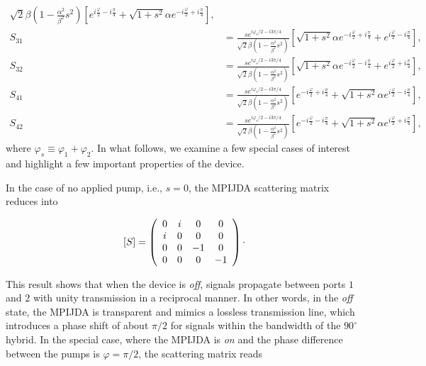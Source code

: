 \documentclass[aip,onecolumn,10pt]{revtex4}%
\begin{document}
\begin{align}
{}{\sqrt{2}\beta\left(  1-\frac{\alpha^{2}}{\beta^{2}}s^{2}\right)  }\left[
e^{i\frac{\varphi}{2}-i\frac{\pi}{4}}+\sqrt{1+s^{2}}\alpha e^{-i\frac
	{\varphi}{2}+i\frac{\pi}{4}}\right]  ,\label{S24}\\
S_{31} &  =\frac{se^{i  \varphi_{s}  /2-i3\pi/4}%
}{\sqrt{2}\beta\left(  1-\frac{\alpha^{2}}{\beta^{2}}s^{2}\right)  }\left[
\sqrt{1+s^{2}}\alpha e^{-i\frac{\varphi}{2}+i\frac{\pi}{4}}%
+e^{i\frac{\varphi}{2}-i\frac{\pi}{4}}\right]  ,\label{S31}\\
S_{32} &  =\frac{se^{i  \varphi_{s}  /2-i3\pi/4}%
}{\sqrt{2}\beta\left(  1-\frac{\alpha^{2}}{\beta^{2}}s^{2}\right)  }\left[
\sqrt{1+s^{2}}\alpha e^{-i\frac{\varphi}{2}-i\frac{\pi}{4}}%
+e^{i\frac{\varphi}{2}+i\frac{\pi}{4}}\right]  ,\label{S32}\\
S_{41} &  =\frac{se^{i  \varphi_{s}  /2-i3\pi/4}%
}{\sqrt{2}\beta\left(  1-\frac{\alpha^{2}}{\beta^{2}}s^{2}\right)  }\left[
e^{-i\frac{\varphi}{2}+i\frac{\pi}{4}}+\sqrt{1+s^{2}}\alpha
e^{i\frac{\varphi}{2}-i\frac{\pi}{4}}\right]  ,\label{S41}\\
S_{42} &  =\frac{se^{i  \varphi_{s}  /2-i3\pi/4}%
}{\sqrt{2}\beta\left(  1-\frac{\alpha^{2}}{\beta^{2}}s^{2}\right)  }\left[
e^{-i\frac{\varphi}{2}-i\frac{\pi}{4}}+\sqrt{1+s^{2}}\alpha
e^{i\frac{\varphi}{2}+i\frac{\pi}{4}}\right]  ,\label{S42}
\end{align}
where $\varphi_{s}\equiv\varphi_{1}+\varphi_{2}$. In what follows, we examine a few special cases of interest and highlight a few important properties of the device. 

In the case of no applied pump, i.e., $s=0$, the MPIJDA scattering matrix reduces into

\begin{equation}
\left[  S\right]  =\left(
\begin{array}
[c]{cccc}%
0 & i & 0 & 0\\
i & 0 & 0 & 0\\
0 & 0 & -1 & 0\\
0 & 0 & 0 & -1
\end{array}
\right) \cdot\label{S_mat_s_zero}
\end{equation}

This result shows that when the device is \textit{off}, signals propagate between ports $1$ and $2$ with unity transmission in a reciprocal manner. In other words, in the \textit{off} state, the MPIJDA is transparent and mimics a lossless transmission line, which introduces a phase shift of about $\pi/2$ for signals within the bandwidth of the $90^{\circ}$ hybrid.
In the special case, where the MPIJDA is \textit{on} and the phase difference between the pumps is $\varphi=\pi/2$, the scattering matrix reads
\end{document}
